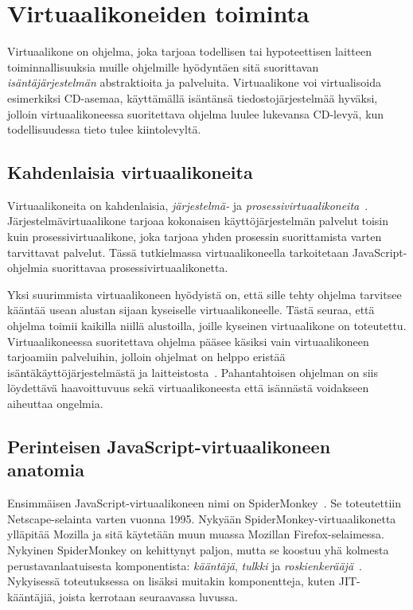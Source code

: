 \section{Virtuaalikoneiden toiminta}

Virtuaalikone on ohjelma, joka tarjoaa todellisen tai hypoteettisen laitteen toiminnallisuuksia muille ohjelmille hyödyntäen sitä suorittavan \textit{isäntäjärjestelmän} abstraktioita ja palveluita. Virtuaalikone voi virtualisoida esimerkiksi CD-asemaa, käyttämällä isäntänsä tiedostojärjestelmää hyväksi, jolloin virtuaalikoneessa suoritettava ohjelma luulee lukevansa CD-levyä, kun todellisuudessa tieto tulee kiintolevyltä.

\subsection{Kahdenlaisia virtuaalikoneita}

Virtuaalikoneita on kahdenlaisia, \textit{järjestelmä-} ja \textit{prosessivirtuaalikoneita}~\cite[s.~33]{vms}. Järjestelmävirtuaalikone tarjoaa kokonaisen käyttöjärjestelmän palvelut toisin kuin prosessivirtuaalikone, joka tarjoaa yhden prosessin suorittamista varten tarvittavat palvelut. Tässä tutkielmassa virtuaalikoneella tarkoitetaan JavaScript-ohjelmia suorittavaa prosessivirtuaalikonetta.

Yksi suurimmista virtuaalikoneen hyödyistä on, että sille tehty ohjelma tarvitsee kääntää usean alustan sijaan kyseiselle virtuaalikoneelle. Tästä seuraa, että ohjelma toimii kaikilla niillä alustoilla, joille kyseinen virtuaalikone on toteutettu. Virtuaalikoneessa suoritettava ohjelma pääsee käsiksi vain virtuaalikoneen tarjoamiin palveluihin, jolloin ohjelmat on helppo eristää isäntäkäyttöjärjestelmästä ja laitteistosta~\cite[s.~36]{vms}. Pahantahtoisen ohjelman on siis löydettävä haavoittuvuus sekä virtuaalikoneesta että isännästä voidakseen aiheuttaa ongelmia.

\subsection{Perinteisen JavaScript-virtuaalikoneen anatomia}

Ensimmäisen JavaScript-virtuaalikoneen nimi on SpiderMonkey~\cite{spidermonkey}. Se toteutettiin Netscape-selainta varten vuonna 1995. Nykyään SpiderMonkey-virtuaalikonetta ylläpitää Mozilla ja sitä käytetään muun muassa Mozillan Firefox-selaimessa. Nykyinen SpiderMonkey on kehittynyt paljon, mutta se koostuu yhä kolmesta perustavanlaatuisesta komponentista: \textit{kääntäjä}, \textit{tulkki} ja \textit{roskienkerääjä}~\cite{spidermonkeydesign}. Nykyisessä toteutuksessa on lisäksi muitakin komponentteja, kuten JIT-kääntäjiä, joista kerrotaan seuraavassa luvussa.

